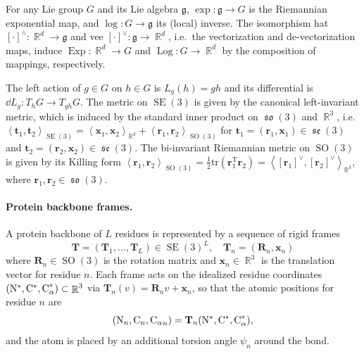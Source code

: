 \documentclass{article}
\theoremstyle{plain}
\theoremstyle{definition}
\theoremstyle{remark}
\DeclareMathOperator{\SE}{SE}
\DeclareMathOperator{\SO}{SO}
\DeclareMathOperator{\se}{\mathfrak{se}}
\DeclareMathOperator{\so}{\mathfrak{so}}
\DeclareMathOperator{\Exp}{\operatorname{Exp}}
\DeclareMathOperator{\Log}{\operatorname{Log}}
\DeclareMathOperator{\R}{\mathbb{R}}
\newcommand{\inner}[2]{\left\langle #1, #2\right\rangle}
\begin{document}
For any Lie group $G$ and its Lie algebra $\mathfrak{g}$, $\exp:\mathfrak{g}\to G$ is the Riemannian exponential map, and $\log:G\to\mathfrak{g}$ its (local) inverse. The isomorphism hat $[\cdot]^\wedge:\R^d \to\mathfrak{g}$ and vee $[\cdot]^\vee:\mathfrak{g}\to\R^d$, i.e.\ the vectorization and de-vectorization maps, induce $\Exp:\R^d\to G$ and $\Log:G\to\R^d$ by the composition of mappings, respectively.

The left action of $g\in G$ on $h\in G$ is $L_g(h)=gh$ and its differential is $\dd L_g: T_hG\to T_{gh}G$. The metric on $\SE(3)$ is given by the canonical left-invariant metric, which is induced by the standard inner product on $\so(3)$ and $\R^3$, i.e.\ $\inner{\mathbf{t}_1}{\mathbf{t}_2}_{\SE(3)}=\inner{\mathbf{x}_1}{\mathbf{x}_2}_{\R^3}+\inner{\mathbf{r}_1}{\mathbf{r}_2}_{\SO(3)}$ for $\mathbf{t}_1 =(\mathbf{r}_1,\mathbf{x}_1) \in \se(3)$ and $\mathbf{t}_2 =(\mathbf{r}_2,\mathbf{x}_2) \in \se(3)$. The bi-invariant Riemannian metric on $\SO(3)$ is given by its Killing form $\inner{\mathbf{r}_1}{\mathbf{r}_2}_{\SO(3)}=\frac{1}{2}\mathrm{tr}(\mathbf{r}_1^\mathrm{T}\mathbf{r}_2)=\inner{[\mathbf{r}_1]^\vee}{[\mathbf{r}_2]^\vee}_{\R^3}$, where $\mathbf{r}_1,\mathbf{r}_2\in\so(3)$.

\paragraph{Protein backbone frames.}
A protein backbone of $L$ residues is represented by a sequence of rigid frames
\begin{equation*}
    \mathbf{T} = (\mathbf{T}_1,\dots,\mathbf{T}_L) \in \SE(3)^L,
    \quad \mathbf{T}_n=(\mathbf{R}_n,\mathbf{x}_n)
\end{equation*}
where $\mathbf{R}_n\in\SO(3)$ is the rotation matrix and $\mathbf{x}_n\in\R^3$ is the translation vector for residue $n$.
Each frame acts on the idealized residue coordinates $(\ce{N}^*,\ce{C}^*,\ce{C_\alpha}^*)\subset\R^3$ via
$\mathbf{T}_n(v)=\mathbf{R}_n v+\mathbf{x}_n$, so that the atomic positions for residue $n$ are
\begin{equation*}
    (\ce{N}_n,\ce{C}_n,{\ce{C_\alpha}}_n)=\mathbf{T}_n (\ce{N}^*,\ce{C}^*,\ce{C_\alpha}^*),
\end{equation*}
and the  atom is placed by an additional torsion angle $\psi_n$ around the  bond.
\end{document}
